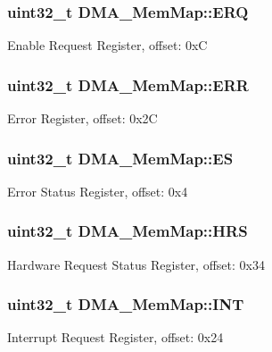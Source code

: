 \subsubsection[{E\+R\+Q}]{\setlength{\rightskip}{0pt plus 5cm}uint32\+\_\+t D\+M\+A\+\_\+\+Mem\+Map\+::\+E\+R\+Q}\label{struct_d_m_a___mem_map_a5dd80d7a64d93b113f306641b42d4365}
Enable Request Register, offset\+: 0x\+C \hypertarget{struct_d_m_a___mem_map_a760f1e1822f3943fa11d044d350d260f}{}
\subsubsection[{E\+R\+R}]{\setlength{\rightskip}{0pt plus 5cm}uint32\+\_\+t D\+M\+A\+\_\+\+Mem\+Map\+::\+E\+R\+R}\label{struct_d_m_a___mem_map_a760f1e1822f3943fa11d044d350d260f}
Error Register, offset\+: 0x2\+C \hypertarget{struct_d_m_a___mem_map_a4c51938d27cc66f0d060c66ec7089ec7}{}
\subsubsection[{E\+S}]{\setlength{\rightskip}{0pt plus 5cm}uint32\+\_\+t D\+M\+A\+\_\+\+Mem\+Map\+::\+E\+S}\label{struct_d_m_a___mem_map_a4c51938d27cc66f0d060c66ec7089ec7}
Error Status Register, offset\+: 0x4 \hypertarget{struct_d_m_a___mem_map_af755455c2b137f7e78d5f53dc60e2049}{}
\subsubsection[{H\+R\+S}]{\setlength{\rightskip}{0pt plus 5cm}uint32\+\_\+t D\+M\+A\+\_\+\+Mem\+Map\+::\+H\+R\+S}\label{struct_d_m_a___mem_map_af755455c2b137f7e78d5f53dc60e2049}
Hardware Request Status Register, offset\+: 0x34 \hypertarget{struct_d_m_a___mem_map_ab602231c6f6dc6b5a5ca439f69440251}{}
\subsubsection[{I\+N\+T}]{\setlength{\rightskip}{0pt plus 5cm}uint32\+\_\+t D\+M\+A\+\_\+\+Mem\+Map\+::\+I\+N\+T}\label{struct_d_m_a___mem_map_ab602231c6f6dc6b5a5ca439f69440251}
Interrupt Request Register, offset\+: 0x24 \hypertarget{struct_d_m_a___mem_map_af959fbf83990ff94c7fa02b545b161c2}{}
